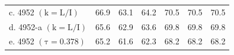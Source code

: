 \documentclass[12pt,journal,compsoc]{IEEEtran}
\begin{document}
\begin{table}
\begin{tabular}{lllllll}
c. 4952 $\mathrm{(k = L/I)}$     & 66.9 & 63.1 & 64.2 & 70.5 & 70.5 & 70.5 \\
d. 4952-a $\mathrm{(k = L/I)}$ & 65.6 & 62.9 & 63.6 & 69.8 & 69.8 & 69.8 \\
e. 4952 $\mathrm{(\tau = 0.378)}$ & 65.2 & 61.6 & 62.3 & 68.2 & 68.2 & 68.2 \\
\bottomrule
\end{tabular}
\end{table}
\end{document}
